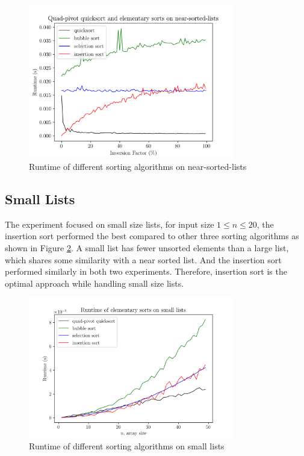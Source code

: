 \documentclass[titlepage, 12pt]{article}
\begin{document}
\begin{figure}[h]
  \centering
  \includegraphics[width=0.8\textwidth]{near-sorted} 
  \caption{Runtime of different sorting algorithms on near-sorted-lists}
  \label{fig:near-sorted}
\end{figure}

\subsection{Small Lists}
\label{sec:small}

The experiment focused on small size lists, for input size \( 1 \leq n \leq 20
\), the insertion sort performed the best compared to other three sorting
algorithms as shown in Figure \ref{fig:small}. A small list has fewer unsorted
elements than a large list, which shares some similarity with a near sorted
list. And the insertion sort performed similarly in both two experiments.
Therefore, insertion sort is the optimal approach while handling small size
lists.

\begin{figure}[h]
  \centering
  \includegraphics[width=0.8\textwidth]{small}
  \caption{Runtime of different sorting algorithms on small lists}
  \label{fig:small}
\end{figure}
\end{document}
